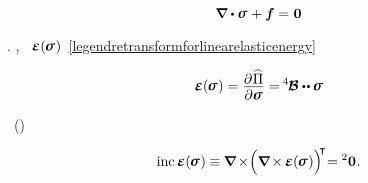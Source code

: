 
\nopagebreak\en{\vspace{-0.125em}}\ru{\vspace{-0.6em}}
\begin{equation}\label{stresseseq:balanceofforces}
\boldnabla \dotp \linearstress \hspace{.15ex} + \bm{f} = \hspace{.1ex} \bm{0}
\end{equation}

\nopagebreak \vspace{-0.2em} \noindent
{} .
, ~${\mathboldepsilon(\hspace{-0.15ex}\linearstress\hspace{.1ex})}$~\eqref{legendretransformforlinearelasticenergy}

\nopagebreak\vspace{-0.2em}\begin{equation}\label{stresseseq:strainfromstress}
\mathboldepsilon(\hspace{-0.15ex}\linearstress\hspace{.1ex}) = \displaystyle \frac{\raisemath{-0.2em}{\partial\hspace{.1ex} \widehat{\Pi}}}{\raisemath{.04em}{\partial \linearstress}} = \hspace{-0.12ex} \pliabilitytensor \dotdotp \hspace{-0.07ex} \linearstress
\end{equation}

\nopagebreak \vspace{-0.5em} \noindent
{}~()

\nopagebreak\vspace{-0.5em}\begin{equation}\label{stresseseq:compatibility}
\operatorname{inc} \mathboldepsilon(\hspace{-0.15ex}\linearstress\hspace{.1ex}) \hspace{-0.06ex}
\equiv
\hspace{-0.07ex} \boldnabla \hspace{-0.2ex} \times \hspace{-0.44ex} \Bigl( \boldnabla \hspace{-0.2ex} \times \hspace{-0.16ex} \mathboldepsilon(\hspace{-0.15ex}\linearstress\hspace{.1ex}) \Bigr)^{\raisemath{-0.12em}{\hspace{-0.44ex}\T}} \hspace{-0.52ex}
= {^2\bm{0}}
\hspace{.1ex} .
\end{equation}


